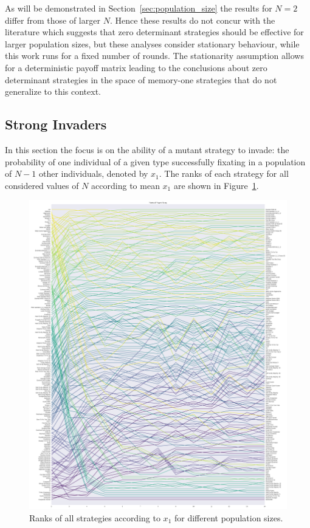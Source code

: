 \documentclass{article}
\begin{document}
As will be demonstrated in Section~\ref{sec:population_size} the results for
\(N=2\) differ from those of larger $N$. Hence these results do not concur with
the literature which suggests that zero determinant strategies should be
effective for larger population sizes, but these analyses consider stationary
behaviour, while this work runs for a fixed number of rounds. \cite{stewart2013extortion}
The stationarity assumption allows for a deterministic payoff matrix
leading to the conclusions about zero determinant strategies in the space
of memory-one strategies that do not generalize to this context.


\subsection{Strong Invaders}\label{sec:strong_invaders}

In this section the focus is on the ability of a mutant strategy to invade: the
probability of one individual of a given type successfully fixating in a
population of \(N - 1\) other individuals, denoted by \(x_1\).
The ranks of each strategy for all considered values of \(N\) according to mean
\(x_1\) are shown in Figure~\ref{fig:ranks_v_size_invade}.

\begin{figure}[!hbtp]
    \centering
    \includegraphics[height=.9\textheight]{./img/average_rank_vs_population_size_invade.pdf}
    \caption{Ranks of all strategies according to \(x_1\) for different
    population sizes.}
    \label{fig:ranks_v_size_invade}
\end{figure}
\end{document}
